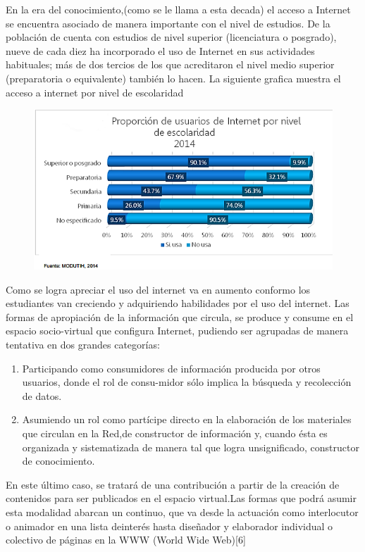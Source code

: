 \documentclass{bmcart}
\begin{document}
En la era del conocimiento,(como se le llama a esta decada) el acceso a Internet se encuentra asociado de manera
importante con el nivel de estudios.
De la población de cuenta con estudios de nivel superior (licenciatura o posgrado), nueve
de cada diez ha incorporado el uso de Internet en sus actividades habituales; más de dos
tercios de los que acreditaron el nivel medio superior (preparatoria o equivalente) también
lo hacen.
La siguiente grafica muestra el acceso a internet por nivel de escolaridad
\begin{figure}[h]
\centering
\includegraphics[width=0.7\linewidth, height=0.2\textheight]{tabla2}
\caption{}
\label{fig:tabla2}
\end{figure}

Como se logra apreciar el uso del internet va en aumento conformo los estudiantes van creciendo y adquiriendo habilidades por el uso del internet.
\newpage 
Las formas de apropiación de la información que circula, se produce y consume en el espacio socio-virtual que configura Internet, pudiendo ser agrupadas de manera tentativa en dos grandes categorías:\\
\begin{enumerate}
	\item Participando como consumidores de información producida por otros usuarios, donde el rol de consu-midor sólo implica la búsqueda y recolección de datos.\\
	\item Asumiendo un rol como partícipe directo en la elaboración de los materiales que circulan en la Red,de constructor de información y, cuando ésta es organizada y sistematizada de manera tal que logra unsignificado, constructor de conocimiento.\\
\end{enumerate}
 
En este último caso, se tratará de una contribución a partir de la creación de contenidos para ser publicados en el espacio virtual.Las formas que podrá asumir esta modalidad abarcan un continuo, que va desde la actuación como interlocutor o animador en una lista deinterés hasta diseñador y elaborador individual o colectivo de páginas en la WWW (World Wide Web)[6]\\
\end{document}
